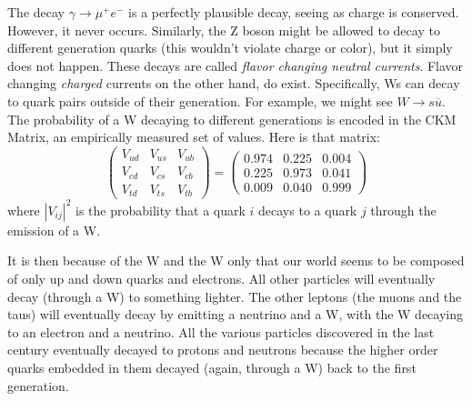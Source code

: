 The decay $\gamma\rightarrow \mu^+e^-$ is a perfectly plausible decay, seeing as charge is conserved. However, it never occurs. Similarly, the Z boson might be allowed to decay to different generation quarks (this wouldn't violate charge or color), but it simply does not happen. These decays are called \textit{flavor changing neutral currents}. Flavor changing \textit{charged} currents on the other hand, do exist. Specifically, Ws can decay to quark pairs outside of their generation. For example, we might see $W\rightarrow s\overline{u}$. The probability of a W decaying to different generations is encoded in the CKM Matrix, an empirically measured set of values. Here is that matrix:
\begin{equation}\label{Eq:CKM}
    \left(\begin{array}{c} V_{ud}\\V_{cd}\\V_{td} \end{array}\begin{array}{c}  V_{us}\\V_{cs}\\V_{ts} \end{array}\begin{array}{c} V_{ub}\\V_{cb}\\V_{tb}  \end{array}\right) = \left(\begin{array}{c} 0.974\\0.225\\0.009 \end{array}\begin{array}{c}  0.225\\0.973\\0.040 \end{array}\begin{array}{c} 0.004\\0.041\\0.999  \end{array}\right)
\end{equation}
where $|V_{ij}|^2$ is the probability that a quark $i$ decays to a quark $j$ through the emission of a W.

It is then because of the W and the W only that our world seems to be composed of only up and down quarks and electrons. All other particles will eventually decay (through a W) to something lighter. The other leptons (the muons and the taus) will eventually decay by emitting a neutrino and a W, with the W decaying to an electron and a neutrino. All the various particles discovered in the last century eventually decayed to protons and neutrons because the higher order quarks embedded in them decayed (again, through a W) back to the first generation.

